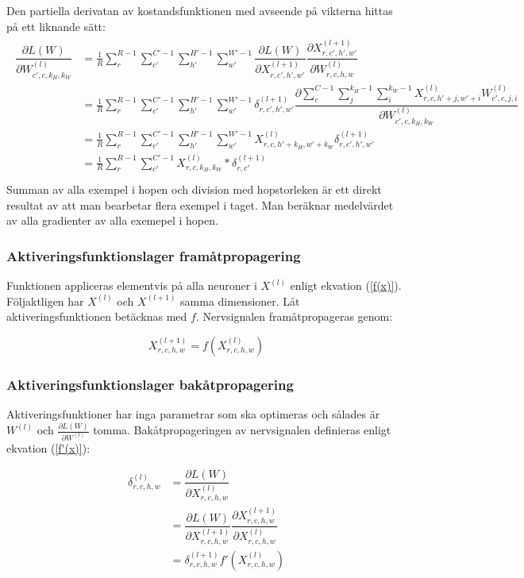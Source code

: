 \documentclass[a4paper,11pt,twoside]{article}
\newcommand*{\pd}[2]{\ensuremath{\dfrac{\partial #1}{\partial #2}}}
\newcommand*{\inpd}[2]{\ensuremath{\frac{\partial #1}{\partial #2}}}
\begin{document}
Den partiella derivatan av kostandsfunktionen med avseende på vikterna hittas på ett liknande sätt:
\begin{align}
\begin{split}
	\pd{L(W)}{W^{(l)}_{c',c,k_H,k_W}}
		& = \frac{1}{R}\sum^{R-1}_{r} \sum^{C'-1}_{c'} \sum^{H'-1}_{h'} \sum^{W'-1}_{w'} \pd{L(W)}{X^{(l+1)}_{r,c',h',w'}} \pd{X^{(l+1)}_{r,c',h',w'}}{W^{(l)}_{r,c,h,w}} \\
		& = \frac{1}{R}\sum^{R-1}_{r} \sum_{c'}^{C'-1} \sum^{H'-1}_{h'} \sum^{W'-1}_{w'} \delta^{(l+1)}_{r,c',h',w'} \pd{\sum\limits^{C-1}_{c} \sum\limits^{k_H-1}_{j} \sum\limits^{k_W-1}_{i} X^{(l)}_{r, c, h'+j, w'+i}W^{(l)}_{c', c, j, i}}{W^{(l)}_{c',c,k_H,k_W}} \\
		& = \frac{1}{R}\sum^{R-1}_{r} \sum^{C'-1}_{c'} \sum^{H'-1}_{h'} \sum^{W'-1}_{w'} X^{(l)}_{r, c, h'+k_H, w'+k_W} \delta^{(l+1)}_{r,c',h',w'} \\
		& = \frac{1}{R}\sum^{R-1}_{r} \sum^{C'-1}_{c'} X^{(l)}_{r, c, k_H, k_W} * \delta^{(l+1)}_{r,c'} \\
\end{split}
\end{align}
Summan av alla exempel i hopen och division med hopstorleken är ett direkt resultat av att man bearbetar flera exempel i taget. Man beräknar medelvärdet av alla gradienter av alla exemepel i hopen.

\subsubsection{Aktiveringsfunktionslager framåtpropagering}
Funktionen appliceras elementvis på alla neuroner i $X^{(l)}$ enligt ekvation (\ref{f(x)}). Följaktligen har $X^{(l)}$ och $X^{(l+1)}$ samma dimensioner. Låt aktiveringsfunktionen betäcknas med $f$. Nervsignalen framåtpropageras genom:

\begin{equation}
X^{(l+1)}_{r,c,h,w} = f(X^{(l)}_{r,c,h,w})
\end{equation}

\subsubsection{Aktiveringsfunktionslager bakåtpropagering}
Aktiveringsfunktioner har inga parametrar som ska optimeras och sålades är $W^{(l)}$ och $\inpd{L(W)}{W^{(l)}}$ tomma. Bakåtpropageringen av nervsignalen definieras enligt ekvation (\ref{f'(x)}):

\begin{equation}
\begin{split}
\delta^{(l)}_{r,c,h,w}
		& = \pd{L(W)}{X^{(l)}_{r,c,h,w}} \\
		& = \pd{L(W)}{X^{(l+1)}_{r,c,h,w}} \pd{X^{(l+1)}_{r,c,h,w}}{X^{(l)}_{r,c,h,w}} \\
		& = \delta^{(l+1)}_{r,c,h,w} f'(X^{(l)}_{r,c,h,w})
\end{split}
\end{equation}
\end{document}
